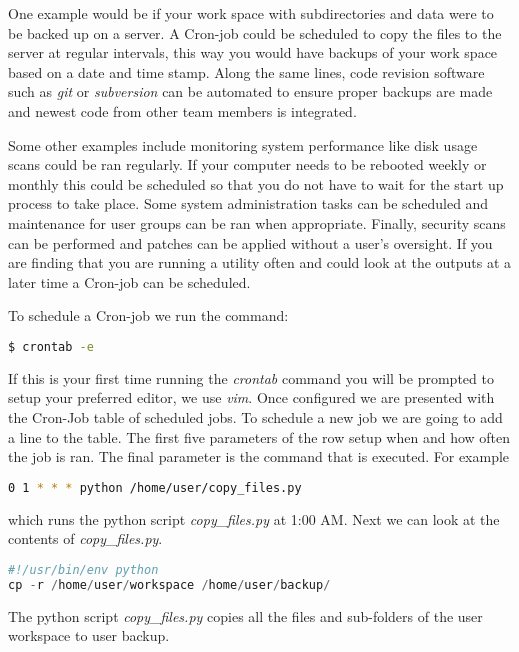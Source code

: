 One example would be if your work space with subdirectories and data were to be backed up on a server. A Cron-job could be scheduled to copy the files to the server at regular intervals, this way you would have backups of your work space based on a date and time stamp. Along the same lines, code revision software such as \emph{git} or \emph{subversion} can be automated to ensure proper backups are made and newest code from other team members is integrated.  

Some other examples include monitoring system performance like disk usage scans could be ran regularly. If your computer needs to be rebooted weekly or monthly this could be scheduled so that you do not have to wait for the start up process to take place. Some system administration tasks can be scheduled and maintenance for user groups can be ran when appropriate. Finally, security scans can be performed and patches can be applied without a user's oversight. If you are finding that you are running a utility often and could look at the outputs at a later time a Cron-job can be scheduled. 

To schedule a Cron-job we run the command:

\begin{lstlisting}[language=bash]
   $ crontab -e
\end{lstlisting}
	
If this is your first time running the \emph{crontab} command you will be prompted to setup your preferred editor, we use \emph{vim}. Once configured we are presented with the Cron-Job table of scheduled jobs. To schedule a new job we are going to add a line to the table. The first five parameters of the row setup when and how often the job is ran. The final parameter is the command that is executed. For example 

\begin{lstlisting}[language=bash]
    0 1 * * * python /home/user/copy_files.py
\end{lstlisting}

which runs the python script \emph{copy\_files.py} at 1:00 AM. Next we can look at the contents of \emph{copy\_files.py}. 

\begin{lstlisting}[language=python]
#!/usr/bin/env python
cp -r /home/user/workspace /home/user/backup/
\end{lstlisting}

The python script \emph{copy\_files.py} copies all the files and sub-folders of the user workspace to user backup. 
	
